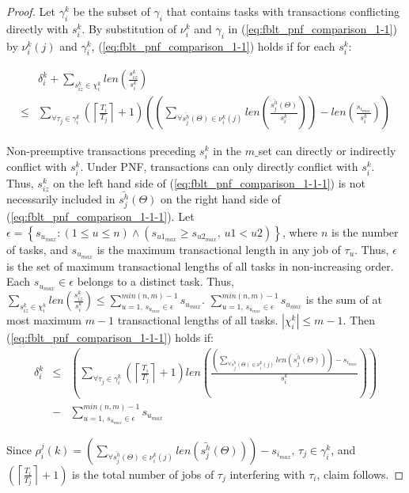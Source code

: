 \documentclass[a4paper,english]{article}
\newtheorem{proof}{Proof}
\begin{document}
\begin{proof}
Let $\gamma_{i}^{k}$ be the subset of $\gamma_{i}$ that contains tasks
with transactions conflicting directly with $s_{i}^{k}$. By substitution of $\nu_i^k$ and $\gamma_i$ in (\ref{eq:fblt_pnf_comparison_1-1}) by $\nu_{i}^{k}(j)$ and $\gamma_{i}^{k}$,
(\ref{eq:fblt_pnf_comparison_1-1}) holds if for each $s_{i}^{k}$:

\begin{eqnarray}
 & \delta_{i}^{k}+\sum_{s_{iz}^{k}\in\chi_{i}^{k}}len(\frac{s_{iz}^{k}}{s_{i}^{k}})\label{eq:fblt_pnf_comparison_1-1-1}\\
\le & \sum_{\forall\tau_{j}\in\gamma_{i}^{k}}\left(\left\lceil \frac{T_{i}}{T_{j}}\right\rceil +1\right)\left(\left(\sum_{\forall\bar{s_{j}^{h}}(\Theta)\in\nu_{i}^{k}(j)}len\left(\frac{\bar{s_{j}^{h}}(\Theta)}{s_{i}^{k}}\right)\right)-len\left(\frac{s_{i_{max}}}{s_{i}^{k}}\right)\right)\nonumber 
\end{eqnarray}

Non-preemptive transactions preceding $s_{i}^{k}$ in the $m\_$set can directly or indirectly  conflict with $s_{i}^{k}$. Under PNF, transactions can only directly conflict with $s_{i}^{k}$. Thus, $s_{iz}^{k}$ on the left hand side of (\ref{eq:fblt_pnf_comparison_1-1-1}) is
not necessarily included in $\bar{s_{j}^{h}}(\Theta)$ on the right
hand side of (\ref{eq:fblt_pnf_comparison_1-1-1}). Let $\epsilon=\left\{ s_{u_{max}}:(1\le u\le n)\wedge\left(s_{u1_{max}}\ge s_{u2_{max}},\, u1<u2\right)\right\} $,
where $n$ is the number of tasks, and $s_{u_{max}}$ is the maximum transactional
length in any job of $\tau_{u}$. Thus, $\epsilon$ is the set of
maximum transactional lengths of all tasks in non-increasing order.
Each $s_{u_{max}}\in\epsilon$ belongs to a distinct task. Thus, $\sum_{s_{iz}^{k}\in\chi_{i}^{k}}len\left(\frac{s_{iz}^{k}}{s_{i}^{k}}\right)\le\sum_{u=1,\, s_{u_{max}}\in\epsilon}^{min(n,m)-1}s_{u_{max}}$.
$\sum_{u=1,\, s_{u_{max}}\in\epsilon}^{min(n,m)-1}s_{u_{max}}$ is
the sum of at most maximum $m-1$ transactional lengths of all tasks.
$|\chi_{i}^{k}|\le m-1$. Then (\ref{eq:fblt_pnf_comparison_1-1-1})
holds if:
\begin{eqnarray*}
\delta_{i}^{k} & \le & \left(\sum_{\forall\tau_{j}\in\gamma_{i}^{k}}\left(\left\lceil \frac{T_{i}}{T_{j}}\right\rceil +1\right)len\left(\frac{\left(\sum_{\forall\bar{s_{j}^{h}}(\Theta)\in\nu_{i}^{k}(j)}len\left(\bar{s_{j}^{h}}(\Theta)\right)\right)-s_{i_{max}}}{s_{i}^{k}}\right)\right)\\
& - & \sum_{u=1,\, s_{u_{max}}\in\epsilon}^{min(n,m)-1}s_{u_{max}}\label{eq:fblt_pnf_comparison_1-1-1-1}
\end{eqnarray*}

Since $\rho_{i}^{j}(k)=\left(\sum_{\forall\bar{s_{j}^{h}}(\Theta)\in\nu_{i}^{k}(j)}len\left(\bar{s_{j}^{h}}(\Theta)\right)\right)-s_{i_{max}},\,\tau_{j}\in\gamma_{i}^{k}$,
and $\left(\left\lceil \frac{T_{i}}{T_{j}}\right\rceil +1\right)$
is the total number of jobs of $\tau_{j}$ interfering with $\tau_{i}$, claim follows.
\end{proof}
\end{document}
